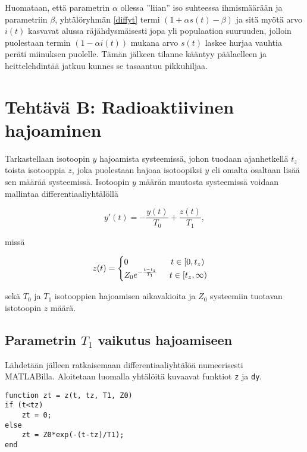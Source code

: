\documentclass[a4paper,11pt]{article}
\begin{document}
Huomataan, että parametrin $\alpha$ ollessa ''liian'' iso suhteessa ihmismäärään ja parametriin $\beta$, yhtälöryhmän \ref{diffyt} termi $(1+\alpha s(t) - \beta)$ ja sitä myötä arvo $i(t)$ kasvavat alussa räjähdysmäisesti jopa yli populaation suuruuden, jolloin puolestaan termin $(1-\alpha i(t))$ mukana arvo $s(t)$ laskee hurjaa vauhtia peräti miinuksen puolelle. Tämän jälkeen tilanne kääntyy päälaelleen ja heittelehdintää jatkuu kunnes se tasaantuu pikkuhiljaa.

\section{Tehtävä B: Radioaktiivinen hajoaminen}

Tarkastellaan isotoopin $y$ hajoamista systeemissä, johon tuodaan ajanhetkellä $t_z$ toista isotooppia $z$, joka puolestaan hajoaa isotoopiksi $y$ eli omalta osaltaan lisää sen määrää systeemissä. Isotoopin $y$ määrän muutosta systeemissä voidaan mallintaa differentiaaliyhtälöllä

\begin{equation}
    y'(t) = -\frac{y(t)}{T_0} + \frac{z(t)}{T_1},
\end{equation}

missä

\begin{equation}
    z(t) =
    \begin{cases}
    0 \hspace{18mm} t \in [0, t_z) \\
    Z_0 e^{-\frac{t-t_z}{T_1}} \hspace{5mm} t \in [t_z, \infty)
    \end{cases}
\end{equation}

sekä $T_0$ ja $T_1$ isotooppien hajoamisen aikavakioita ja $Z_0$ systeemiin tuotavan istotoopin $z$ määrä.

\subsection{Parametrin $T_1$ vaikutus hajoamiseen}
\label{bb}

Lähdetään jälleen ratkaisemaan differentiaaliyhtälöä numeerisesti \\ MATLABilla. Aloitetaan luomalla yhtälöitä kuvaavat funktiot \texttt{z} ja \texttt{dy}.

\begin{lstlisting}
function zt = z(t, tz, T1, Z0)
if (t<tz)
    zt = 0;
else
    zt = Z0*exp(-(t-tz)/T1);
end
\end{lstlisting}
\end{document}
